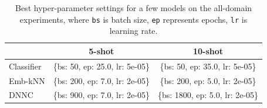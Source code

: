 \begin{table}[t]
\centering
{}\caption{Some hyper-parameter settings for a few models.}\label{table:hyper-paramter}
\end{table}



\begin{table}[t]
\centering
\begin{tabular}{l|cc}
\hline
           & \textbf{5-shot}                 & \textbf{10-shot}                \\ \hline
Classifier & \{bs: 50, ep: 25.0, lr: 5e-05\} & \{bs: 50, ep: 35.0, lr: 5e-05\} \\ \hline
Emb-kNN    & \{bs: 200, ep: 7.0, lr: 2e-05\} & \{bs: 200, ep: 5.0, lr: 2e-05\}  \\ \hline
DNNC       & \{bs: 900, ep: 7.0, lr: 2e-05\} &  \{bs: 1800, ep: 5.0, lr: 2e-05\} \\ \hline
\end{tabular}
\caption{Best hyper-parameter settings for a few models on the all-domain experiments, where {\tt bs} is batch size, {\tt ep} represents epochs, {\tt lr} is learning rate.}\label{table:hyper-paramter-best-all}
\end{table}



